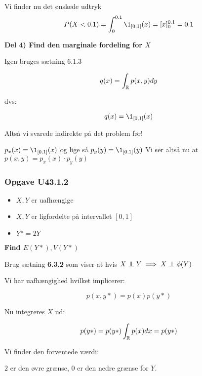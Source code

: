 Vi finder nu det ønskede udtryk
\begin{equation}
    P(X < 0.1) = \int_{0}^{0.1} \1_{[0,1]}(x) = [x]_{0}^{0.1} = 0.1
\end{equation}

\textbf{Del 4) Find den marginale fordeling for $X$}

Igen bruges sætning $6.1.3$

\begin{equation}
    q(x) = \int_{\mathbb{R}} p(x,y) dy
\end{equation}

dvs:

\begin{equation}
    q(x) = \1_{[0,1]}(x)
\end{equation}

Altså vi svarede indirekte på det problem før!

$p_{x}(x) = \1_{[0,1]}(x)$ og lige så $p_y (y) = \1_{[0,1]}(y)$ Vi ser altså nu at $p(x,y) = p_x (x) \cdot p_y (y)$

\subsubsection{Opgave U43.1.2}

\begin{itemize}
    \item $X,Y$ er uafhængige
    \item $X, Y$ er ligfordelte på intervallet $[0,1]$
    \item $Y* = 2Y$
\end{itemize}

\textbf{Find $E(Y*), V(Y*)$}



Brug sætning \textbf{6.3.2} som viser at hvis $X \independent  Y \implies X \independent \phi(Y)$

Vi har uafhængighed hvilket implicerer:

\begin{equation}
    p(x,y*) = p(x) p(y*)
\end{equation}

Nu integreres $X$ ud:

\begin{equation}
    p(y*) = p(y*) \int_{\mathbb{R}}p(x) dx = p(y*)
\end{equation}

Vi finder den forventede værdi:

$2$ er den øvre grænse, $0$ er den nedre grænse for $Y$. 


